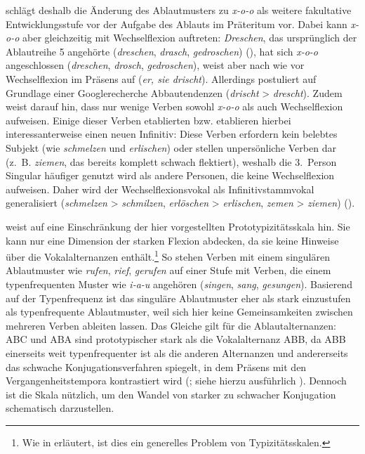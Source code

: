 \textcite[182--183]{Nowak.2013} schlägt deshalb die Änderung des Ablautmusters zu \textit{x-o-o} als weitere fakultative Entwicklungsstufe vor der Aufgabe des Ablauts im Präteritum vor. Dabei kann \textit{x-o-o} aber gleichzeitig mit Wechselflexion auftreten: \textit{Dreschen}, das ursprünglich der Ablautreihe 5 angehörte (\textit{dreschen}, \textit{drasch}, \textit{gedroschen}) (\cite[176]{Nowak.2013}), hat sich \textit{x-o-o} angeschlossen  (\textit{dreschen}, \textit{drosch}, \textit{gedroschen}), weist aber nach wie vor Wechselflexion im Präsens auf (\textit{er, sie drischt}). Allerdings postuliert \textcite[133]{Nowak.2016} auf Grundlage einer Googlerecherche Abbautendenzen (\textit{drischt} > \textit{drescht}). Zudem weist \textcite[33]{Nowak.2016} darauf hin, dass nur wenige Verben sowohl \textit{x-o-o} als auch Wechselflexion aufweisen. Einige dieser Verben etablierten bzw. etablieren hierbei interessanterweise einen neuen Infinitiv: Diese Verben erfordern kein belebtes Subjekt (wie \textit{schmelzen} und \textit{erlischen}) oder stellen unpersönliche Verben dar (z.~B. \textit{ziemen}, das bereits komplett schwach flektiert), weshalb die 3.~Person Singular häufiger genutzt wird als andere Personen, die keine Wechselflexion aufweisen. Daher wird der Wechselflexionsvokal als Infinitivstammvokal generalisiert (\textit{schmelzen} > \textit{schmilzen}, \textit{erlöschen} > \textit{erlischen}, \textit{zemen} > \textit{ziemen})  (\cite[249]{Bittner.2010}). 

\textcite[132]{Nowak.2016} weist auf eine Einschränkung der hier vorgestellten Pro\-to\-ty\-pi\-zi\-täts\-skala hin. Sie kann nur eine Dimension der starken Flexion abdecken, da sie keine Hinweise über die Vokalalternanzen enthält.\footnote{Wie in  erläutert, ist dies ein generelles Problem von Typizitätsskalen.} So stehen Verben mit einem singulären Ablautmuster wie \textit{rufen}, \textit{rief}, \textit{gerufen} auf einer Stufe mit Verben, die einem typenfrequenten Muster wie \textit{i-a-u} angehören (\textit{singen}, \textit{sang}, \textit{gesungen}). Basierend auf der Typenfrequenz ist das singuläre Ablautmuster eher als stark einzustufen als typenfrequente Ablautmuster, weil sich hier keine Gemeinsamkeiten zwischen mehreren Verben ableiten lassen. Das Gleiche gilt für die Ablautalternanzen:  ABC und ABA sind prototypischer stark als die Vokalalternanz ABB, da ABB einerseits weit typenfrequenter ist als die anderen Alternanzen und andererseits das schwache Konjugationsverfahren spiegelt, in dem Präsens mit den Vergangenheitstempora kontrastiert wird (\cite[135--136]{Nowak.2016}; siehe hierzu ausführlich ). Dennoch ist die Skala nützlich, um den Wandel von starker zu schwacher Konjugation schematisch darzustellen. 

